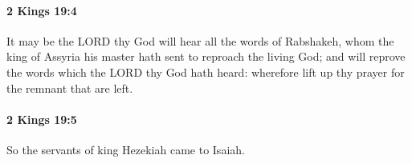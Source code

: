 		\paragraph{2 Kings 19:4} %
			\label{2KINGS-19-4}

			It may be the LORD thy God will hear all the words of Rabshakeh, whom the king of Assyria his master hath sent to reproach the living God; and will reprove the words which the LORD thy God hath heard: wherefore lift up thy prayer for the remnant that are left.


		\paragraph{2 Kings 19:5} %
			\label{2KINGS-19-5}

			So the servants of king Hezekiah came to Isaiah.


